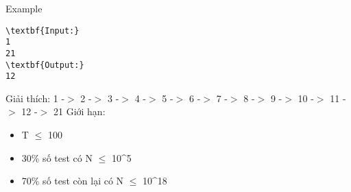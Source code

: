 Example
\begin{verbatim}
\textbf{Input:}
1
21
\textbf{Output:}
12\end{verbatim}
Giải thích:
1 -$>$ 2 -$>$ 3 -$>$ 4 -$>$ 5 -$>$ 6 -$>$ 7 -$>$ 8 -$>$ 9 -$>$ 10 -$>$ 11 -$>$ 12 -$>$ 21
Giới hạn:
\begin{itemize}
	\item T  $\le$  100
	\item 30\% số test có N  $\le$  10^5
	\item 70\% số test còn lại có N  $\le$  10^18
\end{itemize}
